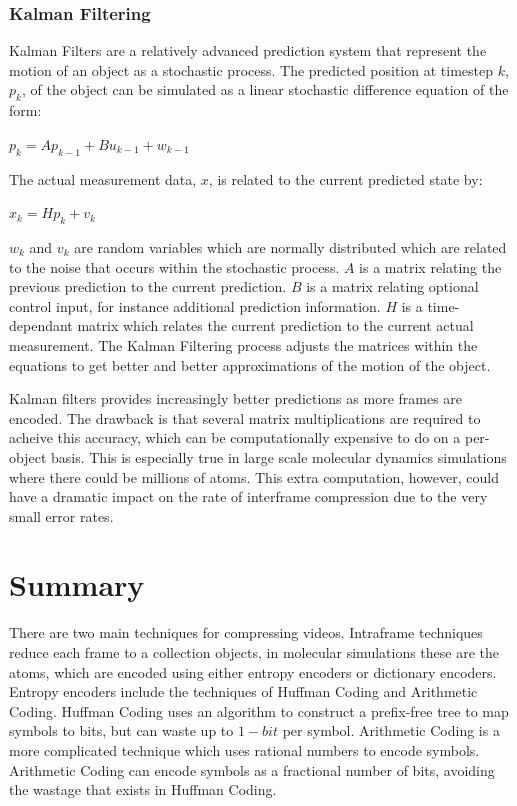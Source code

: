 \documentclass[a4paper,11pt]{report}
\begin{document}
\subsubsection{Kalman Filtering}

Kalman Filters are a relatively advanced prediction system that represent the motion of an object as a stochastic process.\cite{welch1995ikf} The predicted position at timestep $k$, $p_k$, of the object can be simulated as a linear stochastic difference equation of the form:
\begin{center} $p_k = Ap_{k-1} + Bu_{k-1} + w_{k-1}$  \end{center}
The actual measurement data, $x$, is related to the current predicted state by:
\begin{center} $x_k = Hp_k + v_k$ \end{center}
$w_k$ and $v_k$ are random variables which are normally distributed which are related to the noise that occurs within the stochastic process. $A$ is a matrix relating the previous prediction to the current prediction. $B$ is a matrix relating optional control input, for instance additional prediction information. $H$ is a time-dependant matrix which relates the current prediction to the current actual measurement. The Kalman Filtering process adjusts the matrices within the equations to get better and better approximations of the motion of the object.

Kalman filters provides increasingly better predictions as more frames are encoded. The drawback is that several matrix multiplications are required to acheive this accuracy, which can be computationally expensive to do on a per-object basis. This is especially true in large scale molecular dynamics simulations where there could be millions of atoms. This extra computation, however, could have a dramatic impact on the rate of interframe compression due to the very small error rates.

\section{Summary}

There are two main techniques for compressing videos. Intraframe techniques reduce each frame to a collection objects, in molecular simulations these are the atoms, which are encoded using either entropy encoders or dictionary encoders. Entropy encoders include the techniques of Huffman Coding and Arithmetic Coding. Huffman Coding uses an algorithm to construct a prefix-free tree to map symbols to bits, but can waste up to $1-bit$ per symbol. Arithmetic Coding is a more complicated technique which uses rational numbers to encode symbols. Arithmetic Coding can encode symbols as a fractional number of bits, avoiding the wastage that exists in Huffman Coding.
\end{document}
